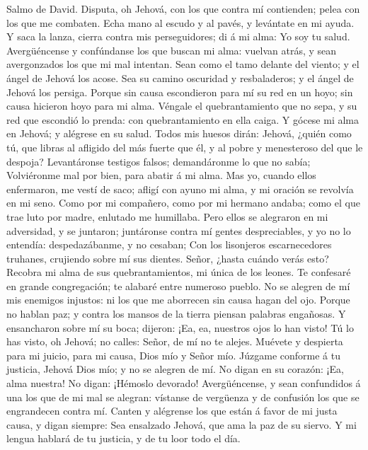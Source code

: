  Salmo de David. Disputa, oh Jehová, con los que contra mí
contienden; pelea con los que me combaten.  Echa mano al
escudo y al pavés, y levántate en mi ayuda.  Y saca la
lanza, cierra contra mis perseguidores; di á mi alma: Yo soy tu salud.
 Avergüéncense y confúndanse los que buscan mi alma:
vuelvan atrás, y sean avergonzados los que mi mal intentan.
 Sean como el tamo delante del viento; y el ángel de
Jehová los acose.  Sea su camino oscuridad y resbaladeros;
y el ángel de Jehová los persiga.  Porque sin causa
escondieron para mí su red en un hoyo; sin causa hicieron hoyo para mi
alma.  Véngale el quebrantamiento que no sepa, y su red
que escondió lo prenda: con quebrantamiento en ella caiga.
 Y gócese mi alma en Jehová; y alégrese en su salud.
 Todos mis huesos dirán: Jehová, ¿quién como tú, que
libras al afligido del más fuerte que él, y al pobre y menesteroso del
que le despoja?  Levantáronse testigos falsos;
demandáronme lo que no sabía;  Volviéronme mal por bien,
para abatir á mi alma.  Mas yo, cuando ellos enfermaron,
me vestí de saco; afligí con ayuno mi alma, y mi oración se revolvía en
mi seno.  Como por mi compañero, como por mi hermano
andaba; como el que trae luto por madre, enlutado me humillaba.
 Pero ellos se alegraron en mi adversidad, y se juntaron;
juntáronse contra mí gentes despreciables, y yo no lo entendía:
despedazábanme, y no cesaban;  Con los lisonjeros
escarnecedores truhanes, crujiendo sobre mí sus dientes. 
Señor, ¿hasta cuándo verás esto? Recobra mi alma de sus
quebrantamientos, mi única de los leones.  Te confesaré
en grande congregación; te alabaré entre numeroso pueblo.
 No se alegren de mí mis enemigos injustos: ni los que me
aborrecen sin causa hagan del ojo.  Porque no hablan paz;
y contra los mansos de la tierra piensan palabras engañosas.
 Y ensancharon sobre mí su boca; dijeron: ¡Ea, ea,
nuestros ojos lo han visto!  Tú lo has visto, oh Jehová;
no calles: Señor, de mí no te alejes.  Muévete y
despierta para mi juicio, para mi causa, Dios mío y Señor mío.
 Júzgame conforme á tu justicia, Jehová Dios mío; y no se
alegren de mí.  No digan en su corazón: ¡Ea, alma
nuestra! No digan: ¡Hémoslo devorado!  Avergüéncense, y
sean confundidos á una los que de mi mal se alegran: vístanse de
vergüenza y de confusión los que se engrandecen contra mí.
 Canten y alégrense los que están á favor de mi justa
causa, y digan siempre: Sea ensalzado Jehová, que ama la paz de su
siervo.  Y mi lengua hablará de tu justicia, y de tu loor
todo el día.

